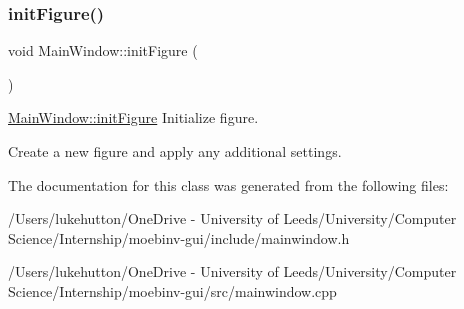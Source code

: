 \subsubsection{\texorpdfstring{init\+Figure()}{initFigure()}}
{\footnotesize\ttfamily void Main\+Window\+::init\+Figure (\begin{DoxyParamCaption}{ }\end{DoxyParamCaption})}



\mbox{\hyperlink{class_main_window_ad0adb1cd734f6bba159f13fd332d62f5}{Main\+Window\+::init\+Figure}} Initialize figure. 

Create a new figure and apply any additional settings. 

The documentation for this class was generated from the following files\+:\begin{DoxyCompactItemize}
\item 
/\+Users/lukehutton/\+One\+Drive -\/ University of Leeds/\+University/\+Computer Science/\+Internship/moebinv-\/gui/include/mainwindow.\+h\item 
/\+Users/lukehutton/\+One\+Drive -\/ University of Leeds/\+University/\+Computer Science/\+Internship/moebinv-\/gui/src/mainwindow.\+cpp\end{DoxyCompactItemize}
